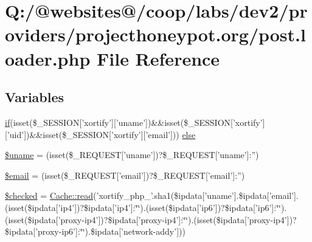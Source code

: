 \hypertarget{projecthoneypot_8org_2post_8loader_8php}{\section{Q\-:/@websites@/coop/labs/dev2/providers/projecthoneypot.org/post.loader.\-php File Reference}
\label{projecthoneypot_8org_2post_8loader_8php}
}
\subsection*{Variables}
\begin{DoxyCompactItemize}
\item 
\hyperlink{index_8php_ae2ccdf355624402b65fc2226f2a661cd}{if}(isset(\$\-\_\-\-S\-E\-S\-S\-I\-O\-N\mbox{[}'xortify'\mbox{]}\mbox{[}'uname'\mbox{]})\&\&isset(\$\-\_\-\-S\-E\-S\-S\-I\-O\-N\mbox{[}'xortify'\mbox{]}\mbox{[}'uid'\mbox{]})\&\&isset(\$\-\_\-\-S\-E\-S\-S\-I\-O\-N\mbox{[}'xortify'\mbox{]}\mbox{[}'email'\mbox{]})) \hyperlink{projecthoneypot_8org_2post_8loader_8php_a99f38b0c8c178a9286d03586510aa646}{else}
\item 
\hyperlink{projecthoneypot_8org_2post_8loader_8php_a227a9443cabbe5e23cfc10c4371e09d1}{\$uname} = (isset(\$\-\_\-\-R\-E\-Q\-U\-E\-S\-T\mbox{[}'uname'\mbox{]})?\$\-\_\-\-R\-E\-Q\-U\-E\-S\-T\mbox{[}'uname'\mbox{]}\-:'')
\item 
\hyperlink{projecthoneypot_8org_2post_8loader_8php_ad634f418b20382e2802f80532d76d3cd}{\$email} = (isset(\$\-\_\-\-R\-E\-Q\-U\-E\-S\-T\mbox{[}'email'\mbox{]})?\$\-\_\-\-R\-E\-Q\-U\-E\-S\-T\mbox{[}'email'\mbox{]}\-:'')
\item 
\hyperlink{projecthoneypot_8org_2post_8loader_8php_aae831eeaf71994cc7e31c1412a29f6fd}{\$checked} = \hyperlink{class_cache_a5870656fdf4e51f8bb35330a8f96ed6c}{Cache\-::read}('xortify\-\_\-php\-\_\-'.sha1(\$ipdata\mbox{[}'uname'\mbox{]}.\$ipdata\mbox{[}'email'\mbox{]}.(isset(\$ipdata\mbox{[}'ip4'\mbox{]})?\$ipdata\mbox{[}'ip4'\mbox{]}\-:\char`\"{}\char`\"{}).(isset(\$ipdata\mbox{[}'ip6'\mbox{]})?\$ipdata\mbox{[}'ip6'\mbox{]}\-:\char`\"{}\char`\"{}).(isset(\$ipdata\mbox{[}'proxy-\/ip4'\mbox{]})?\$ipdata\mbox{[}'proxy-\/ip4'\mbox{]}\-:\char`\"{}\char`\"{}).(isset(\$ipdata\mbox{[}'proxy-\/ip4'\mbox{]})?\$ipdata\mbox{[}'proxy-\/ip6'\mbox{]}\-:\char`\"{}\char`\"{}).\$ipdata\mbox{[}'network-\/addy'\mbox{]}))
\end{DoxyCompactItemize}


